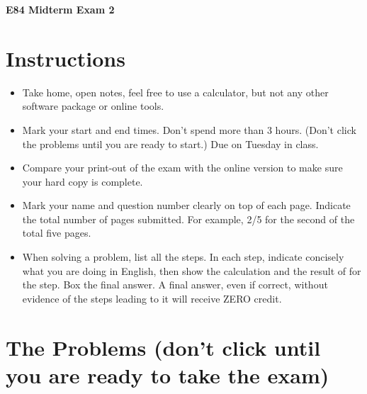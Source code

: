\usepackage{html}

\begin{center}
{\Large \bf  E84 Midterm Exam 2}
\end{center}

\section{Instructions}
\begin{itemize}
\item Take home, open notes, feel free to use a calculator, but not any 
  other software package or online tools.
\item Mark your start and end times. Don't spend more than 3 hours. 
  (Don't click the problems until you are ready to start.)
  Due on Tuesday in class.
\item Compare your print-out of the exam with the online version to make
  sure your hard copy is complete.
\item Mark your name and question number clearly on top of each page.
  Indicate the total number of pages submitted. For example, 2/5 for 
  the second of the total five pages.
\item When solving a problem, list all the steps. In each step, indicate
  concisely what you are doing in English, then show the calculation 
  and the result of for the step. Box the final answer.
  A final answer, even if correct, without evidence of the steps leading
  to it will receive ZERO credit.
\end{itemize}


\section{The Problems (don't click until you are ready to take the exam)}


